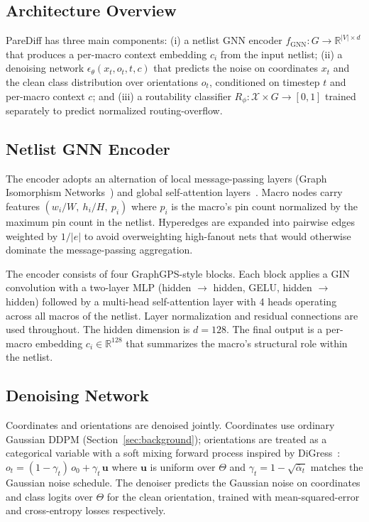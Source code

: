 \documentclass[lettersize,journal]{IEEEtran}
\begin{document}
\subsection{Architecture Overview}

PareDiff has three main components: (i) a netlist GNN encoder $f_\text{GNN}: G \to \mathbb{R}^{|V| \times d}$ that produces a per-macro context embedding $c_i$ from the input netlist; (ii) a denoising network $\epsilon_\theta(x_t, o_t, t, c)$ that predicts the noise on coordinates $x_t$ and the clean class distribution over orientations $o_t$, conditioned on timestep $t$ and per-macro context $c$; and (iii) a routability classifier $R_\phi: \mathcal{X} \times G \to [0, 1]$ trained separately to predict normalized routing-overflow.

\subsection{Netlist GNN Encoder}

The encoder adopts an alternation of local message-passing layers (Graph Isomorphism Networks~\cite{xu2018gin}) and global self-attention layers~\cite{vaswani2017attention}. Macro nodes carry features $(w_i / W,\ h_i / H,\ p_i)$ where $p_i$ is the macro's pin count normalized by the maximum pin count in the netlist. Hyperedges are expanded into pairwise edges weighted by $1/|e|$ to avoid overweighting high-fanout nets that would otherwise dominate the message-passing aggregation.

The encoder consists of four GraphGPS-style blocks. Each block applies a GIN convolution with a two-layer MLP (hidden $\to$ hidden, GELU, hidden $\to$ hidden) followed by a multi-head self-attention layer with 4 heads operating across all macros of the netlist. Layer normalization and residual connections are used throughout. The hidden dimension is $d = 128$. The final output is a per-macro embedding $c_i \in \mathbb{R}^{128}$ that summarizes the macro's structural role within the netlist.

\subsection{Denoising Network}

Coordinates and orientations are denoised jointly. Coordinates use ordinary Gaussian DDPM (Section~\ref{sec:background}); orientations are treated as a categorical variable with a soft mixing forward process inspired by DiGress~\cite{vignac2023digress}: $o_t = (1-\gamma_t)\, o_0 + \gamma_t\, \mathbf{u}$ where $\mathbf{u}$ is uniform over $\Theta$ and $\gamma_t = 1 - \sqrt{\bar{\alpha}_t}$ matches the Gaussian noise schedule. The denoiser predicts the Gaussian noise on coordinates and class logits over $\Theta$ for the clean orientation, trained with mean-squared-error and cross-entropy losses respectively.
\end{document}
